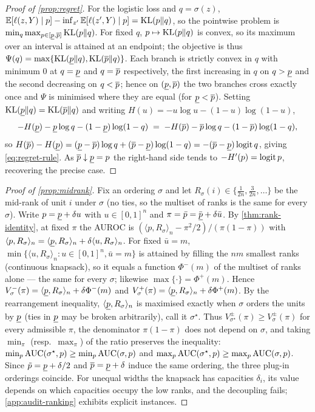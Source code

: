 \begin{proof}[Proof of \cref{prop:regret}]
For the logistic loss and $q=\sigma(z)$,
$\mathbb{E}[\ell(z,Y)\mid p] - \inf_{z'}\mathbb{E}[\ell(z',Y)\mid p] = \operatorname{KL}(p\|q)$, so the
pointwise problem is $\min_{q}\max_{p\in[\underline{p},\overline{p}]}\operatorname{KL}(p\|q)$. For fixed $q$,
$p\mapsto\operatorname{KL}(p\|q)$ is convex, so its maximum over an interval is attained at an
endpoint; the objective is thus
$\Psi(q)=\max\{\operatorname{KL}(\underline{p}\|q),\operatorname{KL}(\overline{p}\|q)\}$. Each branch is strictly convex in
$q$ with minimum $0$ at $q=\underline{p}$ and $q=\overline{p}$ respectively, the first increasing
in $q$ on $q>\underline{p}$ and the second decreasing on $q<\overline{p}$; hence on $(\underline{p},\overline{p})$
the two branches cross exactly once and $\Psi$ is minimised where they are equal
(for $\underline{p}<\overline{p}$). Setting $\operatorname{KL}(\underline{p}\|q)=\operatorname{KL}(\overline{p}\|q)$ and writing
$H(u)=-u\log u-(1-u)\log(1-u)$,
\[
  -H(\underline{p})-\underline{p}\log q-(1-\underline{p})\log(1-q)
  \;=\;
  -H(\overline{p})-\overline{p}\log q-(1-\overline{p})\log(1-q),
\]
so $H(\overline{p})-H(\underline{p}) = (\underline{p}-\overline{p})\log q + (\overline{p}-\underline{p})\log(1-q)
= -(\overline{p}-\underline{p})\operatorname{logit} q$, giving \eqref{eq:regret-rule}. As $\overline{p}\downarrow\underline{p}=p$
the right-hand side tends to $-H'(p)=\operatorname{logit} p$, recovering the precise case.
\end{proof}

\begin{proof}[Proof of \cref{prop:midrank}]
Fix an ordering $\sigma$ and let $R_\sigma(i)\in\{\tfrac{1}{2n},\tfrac{3}{2n},\dots\}$
be the mid-rank of unit $i$ under $\sigma$ (no ties, so the multiset of ranks
is the same for every $\sigma$). Write $p=\underline{p}+\delta u$ with $u\in[0,1]^n$ and
$\pi=\bar p=\bar{\underline{p}}+\delta\bar u$. By \cref{thm:rank-identity}, at fixed
$\pi$ the AUROC is $(\langle p,R_\sigma\rangle_n-\pi^2/2)/(\pi(1-\pi))$ with
$\langle p,R_\sigma\rangle_n=\langle\underline{p},R_\sigma\rangle_n+\delta\langle u,R_\sigma\rangle_n$.
For fixed $\bar u=m$,
$\min\{\langle u,R_\sigma\rangle_n:u\in[0,1]^n,\bar u=m\}$ is attained by
filling the $nm$ smallest ranks (continuous knapsack), so it equals a function
$\Phi^-(m)$ of the multiset of ranks alone --- the same for every $\sigma$; likewise
$\max\{\cdot\}=\Phi^+(m)$. Hence
$V^-_\sigma(\pi)=\langle\underline{p},R_\sigma\rangle_n+\delta\Phi^-(m)$ and
$V^+_\sigma(\pi)=\langle\underline{p},R_\sigma\rangle_n+\delta\Phi^+(m)$. By the
rearrangement inequality, $\langle\underline{p},R_\sigma\rangle_n$ is maximised exactly
when $\sigma$ orders the units by $\underline{p}$ (ties in $\underline{p}$ may be broken
arbitrarily), call it $\sigma^\star$. Thus $V^\pm_{\sigma^\star}(\pi)\ge
V^\pm_\sigma(\pi)$ for every admissible $\pi$, the denominator $\pi(1-\pi)$
does not depend on $\sigma$, and taking $\min_\pi$ (resp.\ $\max_\pi$) of
the ratio preserves the inequality:
$\min_p\operatorname{AUC}(\sigma^\star,p)\ge\min_p\operatorname{AUC}(\sigma,p)$ and
$\max_p\operatorname{AUC}(\sigma^\star,p)\ge\max_p\operatorname{AUC}(\sigma,p)$. Since
$\tilde p=\underline{p}+\delta/2$ and $\overline{p}=\underline{p}+\delta$ induce the same ordering, the
three plug-in orderings coincide. For unequal widths the knapsack has
capacities $\delta_i$, its value depends on which capacities occupy the low
ranks, and the decoupling fails; \cref{app:audit-ranking} exhibits explicit
instances.
\end{proof}

